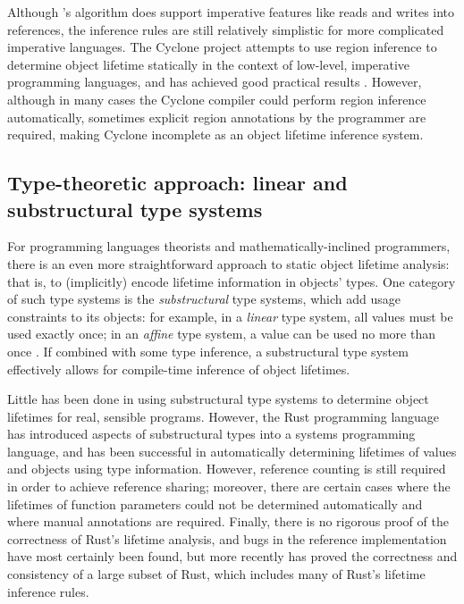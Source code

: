 Although \cite{RegionInference}'s algorithm does support imperative features like reads and writes into references,
the inference rules are still relatively simplistic for more complicated imperative languages. The Cyclone
project attempts to use region inference to determine object lifetime statically in the context of
low-level, imperative programming languages, and has achieved good practical results \citep{Cyclone}. However,
although in many cases the Cyclone compiler could perform region inference automatically, sometimes explicit
region annotations by the programmer are required, making Cyclone incomplete as an object lifetime inference
system.

\subsection{Type-theoretic approach: linear and substructural type systems}
For programming languages theorists and mathematically-inclined programmers, there is an even more straightforward
approach to static object lifetime analysis: that is, to (implicitly) encode lifetime information in objects'
types. One category of such type systems is the \emph{substructural} type systems, which add usage constraints to
its objects: for example, in a \emph{linear} type system, all values must be used exactly once; in an \emph{affine}
type system, a value can be used no more than once \citep{SubstructuralTypes}. If combined with some type
inference, a substructural type system effectively allows for compile-time inference of object lifetimes.

Little has been done in using substructural type systems to determine object lifetimes for real, sensible programs.
However, the Rust programming language \citep{RustLang} has introduced aspects of substructural types into a systems
programming language, and has been successful in automatically determining lifetimes of values and objects using
type information. However, reference counting is still required in order to achieve reference sharing; moreover, there are
certain cases where the lifetimes of function parameters could not be determined automatically and where manual
annotations are required. Finally, there is no rigorous proof of the correctness of Rust's lifetime analysis, and bugs in the
reference implementation have most certainly been found, but more recently \cite{RustBelt} has proved the correctness and consistency
of a large subset of Rust, which includes many of Rust's lifetime inference rules.

